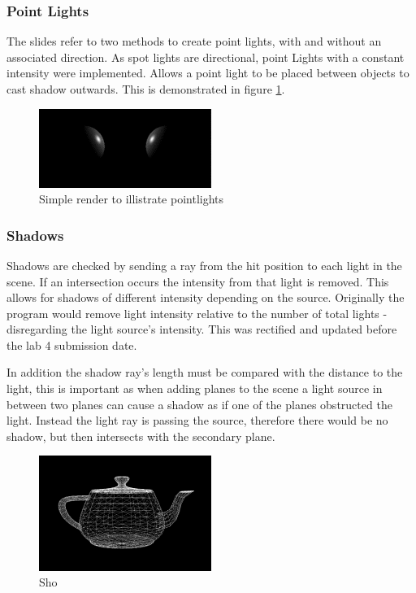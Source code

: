 \documentclass{article}
\begin{document}
\subsubsection{Point Lights}
The slides refer to two methods to create point lights, with and without an associated direction. As spot lights are directional, point Lights with a constant intensity were implemented. Allows a point light to be placed between objects to cast shadow outwards. This is demonstrated in figure \ref{fig:pointlight_white}. 
\begin{figure}[h]
\centering
\includegraphics[width=0.5\textwidth]{pointlight}
\captionsetup{justification=centering,margin=0.5cm}
\caption{Simple render to illistrate pointlights}
\label{fig:pointlight_white}
\end{figure}

\subsubsection{Shadows}
Shadows are checked by sending a ray from the hit position to each light in the scene. If an intersection occurs the intensity from that light is removed. This allows for shadows of different intensity depending on the source. Originally the program would remove light intensity relative to the number of total lights - disregarding the light source's intensity. This was rectified and updated before the lab 4 submission date.

In addition the shadow ray's length must be compared with the distance to the light, this is important as when adding planes to the scene a light source in between two planes can cause a shadow as if one of the planes obstructed the light. Instead the light ray is passing the source, therefore there would be no shadow, but then intersects with the secondary plane.

\begin{figure}[h]
\centering
\includegraphics[width=0.5\textwidth]{wireframe}
\captionsetup{justification=centering,margin=0.5cm}
\caption{Sho}
\label{fig:wireframe}
\end{figure}
\end{document}
